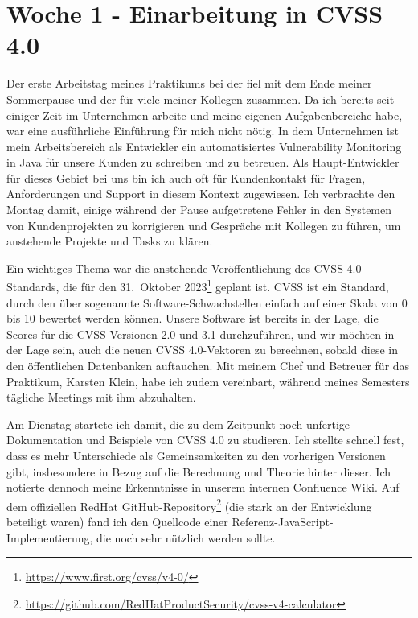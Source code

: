 \section{Woche 1 - Einarbeitung in CVSS 4.0} \label{sec:bericht-wo-1}



Der erste Arbeitstag meines Praktikums bei der {\metaeffekt} fiel mit dem Ende meiner Sommerpause und der für viele meiner Kollegen zusammen.
Da ich bereits seit einiger Zeit im Unternehmen arbeite und meine eigenen Aufgabenbereiche habe, war eine ausführliche Einführung für mich nicht nötig.
In dem Unternehmen ist mein Arbeitsbereich als Entwickler ein automatisiertes Vulnerability Monitoring in Java für unsere Kunden zu schreiben und zu betreuen.
Als Haupt-Entwickler für dieses Gebiet bei uns bin ich auch oft für Kundenkontakt für Fragen, Anforderungen und Support in diesem Kontext zugewiesen.
Ich verbrachte den Montag damit, einige während der Pause aufgetretene Fehler in den Systemen von Kundenprojekten zu korrigieren und Gespräche mit Kollegen zu führen, um anstehende Projekte und Tasks zu klären.

Ein wichtiges Thema war die anstehende Veröffentlichung des CVSS 4.0-Standards, die für den 31.\ Oktober 2023\footnote{\url{https://www.first.org/cvss/v4-0/}} geplant ist.
CVSS ist ein Standard, durch den über sogenannte  Software-Schwachstellen einfach auf einer Skala von 0 bis 10 bewertet werden können.
Unsere Software ist bereits in der Lage, die Scores für die CVSS-Versionen 2.0 und 3.1 durchzuführen, und wir möchten in der Lage sein, auch die neuen CVSS 4.0-Vektoren zu berechnen, sobald diese in den öffentlichen Datenbanken auftauchen.
Mit meinem Chef und Betreuer für das Praktikum, Karsten Klein, habe ich zudem vereinbart, während meines Semesters tägliche Meetings mit ihm abzuhalten.


Am Dienstag startete ich damit, die zu dem Zeitpunkt noch unfertige Dokumentation und Beispiele von CVSS 4.0 zu studieren.
Ich stellte schnell fest, dass es mehr Unterschiede als Gemeinsamkeiten zu den vorherigen Versionen gibt, insbesondere in Bezug auf die Berechnung und Theorie hinter dieser.
Ich notierte dennoch meine Erkenntnisse in unserem internen Confluence Wiki.
Auf dem offiziellen RedHat GitHub-Repository\footnote{\url{https://github.com/RedHatProductSecurity/cvss-v4-calculator}} (die stark an der Entwicklung beteiligt waren) fand ich den Quellcode einer Referenz-JavaScript-Implementierung, die noch sehr nützlich werden sollte.

